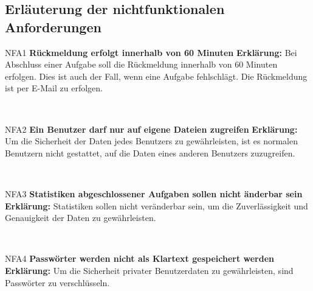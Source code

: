 \documentclass[a4paper,12pt]{article}
\begin{document}
\subsection{Erläuterung der nichtfunktionalen Anforderungen}

\begin{itemize}[nosep]
	\leftskip=0.5cm
	\begin{minipage}[t]{\linewidth}
		\item[NFA1] \hspace{\parindent} \textbf{Rückmeldung erfolgt innerhalb von 60 Minuten}
		\subitem \textbf{Erklärung:} Bei Abschluss einer Aufgabe soll die Rückmeldung innerhalb von 60 Minuten erfolgen. Dies ist auch der Fall, wenn eine Aufgabe fehlschlägt. Die Rückmeldung ist per E-Mail zu erfolgen.
	
	\end{minipage}
	\newline
	\\
	
	\begin{minipage}[t]{\linewidth}
		\item[NFA2]\hspace{\parindent} \textbf{Ein Benutzer darf nur auf eigene Dateien zugreifen}
		\subitem \textbf{Erklärung:} Um die Sicherheit der Daten jedes Benutzers zu gewährleisten, ist es normalen Benutzern nicht gestattet, auf die Daten eines anderen Benutzers zuzugreifen.
	
	\end{minipage}
	\newline
	\\
	
	\begin{minipage}[t]{\linewidth}
		\item[NFA3] \hspace{\parindent} \textbf{Statistiken abgeschlossener Aufgaben sollen nicht änderbar sein}
		\subitem \textbf{Erklärung:} Statistiken sollen nicht veränderbar sein, um die Zuverlässigkeit und Genauigkeit der Daten zu gewährleisten.
	
	\end{minipage}
	\newline
	\\
	
	\begin{minipage}[t]{\linewidth}
		\item[NFA4]\hspace{\parindent} \textbf{Passwörter werden nicht als Klartext gespeichert werden}
		\subitem \textbf{Erklärung:} Um die Sicherheit privater Benutzerdaten zu gewährleisten, sind Passwörter zu verschlüsseln.
	

\end{minipage}
\end{itemize}
\end{document}
